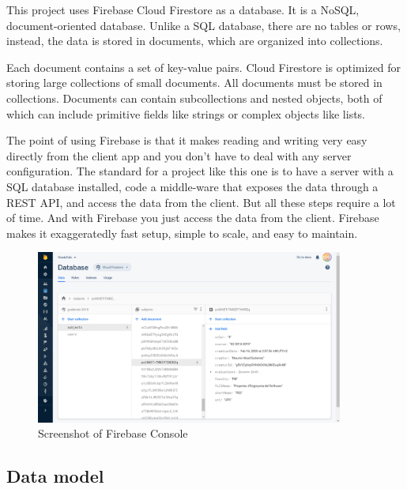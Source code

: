 
This project uses Firebase Cloud Firestore as a database. It is a NoSQL, document-oriented database. Unlike a SQL database, there are no tables or rows, instead, the data is stored in documents, which are organized into collections.

Each document contains a set of key-value pairs. Cloud Firestore is optimized for storing large collections of small documents. All documents must be stored in collections. Documents can contain subcollections and nested objects, both of which can include primitive fields like strings or complex objects like lists. \cite{firebase-datamodel}

The point of using Firebase is that it makes reading and writing very easy directly from the client app and you don't have to deal with any server configuration. The standard for a project like this one is to have a server with a SQL database installed, code a middle-ware that exposes the data through a REST API, and access the data from the client. But all these steps require a lot of time. And with Firebase you just access the data from the client. Firebase makes it exaggeratedly fast setup, simple to scale, and easy to maintain. 

\vfill
\begin{figure}[ht!]
    \center
    \includegraphics[width=0.9\textwidth]{media/firebase-console.png}
    \caption{Screenshot of Firebase Console}
    \label{fig:firebase-console}
\end{figure}
\vfill

\clearpage\newpage
\subsection{Data model}
\label{sec:data-model}

